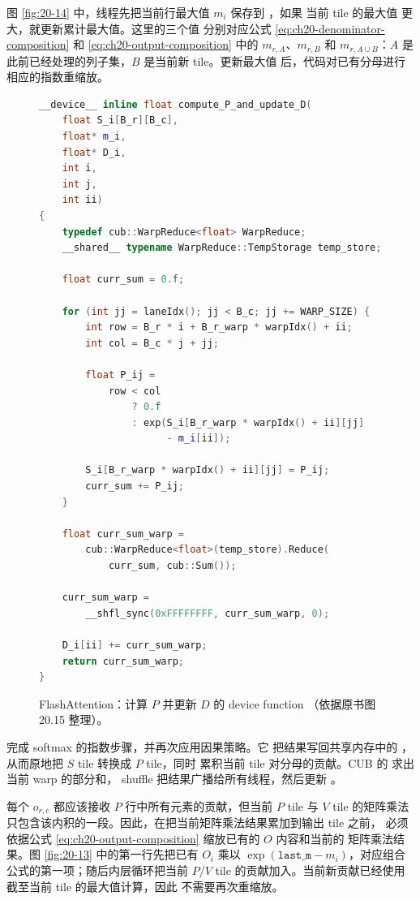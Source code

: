 图 \ref{fig:20-14} 中，线程先把当前行最大值 $m_i$ 保存到 ，如果
当前 tile 的最大值  更大，就更新累计最大值。这里的三个值
分别对应公式 \eqref{eq:ch20-denominator-composition} 和
\eqref{eq:ch20-output-composition} 中的 $m_{r,A}$、$m_{r,B}$ 和
$m_{r,A\cup B}$：$A$ 是此前已经处理的列子集，$B$ 是当前新 tile。更新最大值
后，代码对已有分母进行相应的指数重缩放。

\begin{figure}[htbp]
  \centering
  \begin{lstlisting}[language=C++,basicstyle=\ttfamily\tiny]
__device__ inline float compute_P_and_update_D(
    float S_i[B_r][B_c],
    float* m_i,
    float* D_i,
    int i,
    int j,
    int ii)
{
    typedef cub::WarpReduce<float> WarpReduce;
    __shared__ typename WarpReduce::TempStorage temp_store;

    float curr_sum = 0.f;

    for (int jj = laneIdx(); jj < B_c; jj += WARP_SIZE) {
        int row = B_r * i + B_r_warp * warpIdx() + ii;
        int col = B_c * j + jj;

        float P_ij =
            row < col
                ? 0.f
                : exp(S_i[B_r_warp * warpIdx() + ii][jj]
                      - m_i[ii]);

        S_i[B_r_warp * warpIdx() + ii][jj] = P_ij;
        curr_sum += P_ij;
    }

    float curr_sum_warp =
        cub::WarpReduce<float>(temp_store).Reduce(
            curr_sum, cub::Sum());

    curr_sum_warp =
        __shfl_sync(0xFFFFFFFF, curr_sum_warp, 0);

    D_i[ii] += curr_sum_warp;
    return curr_sum_warp;
}
  \end{lstlisting}
  \caption{FlashAttention：计算 $P$ 并更新 $D$ 的 device function
  （依据原书图 20.15 整理）。}
  \label{fig:20-15}
\end{figure}

 完成 softmax 的指数步骤，并再次应用因果策略。它
把结果写回共享内存中的 ，从而原地把 $S$ tile 转换成 $P$ tile，同时
累积当前 tile 对分母的贡献。CUB 的  求出当前 warp 的部分和，
shuffle 把结果广播给所有线程，然后更新 。

每个 $o_{r,c}$ 都应该接收 $P$ 行中所有元素的贡献，但当前 $P$ tile 与 $V$ tile
的矩阵乘法只包含该内积的一段。因此，在把当前矩阵乘法结果累加到输出 tile 之前，
必须依据公式 \eqref{eq:ch20-output-composition} 缩放已有的 $O$ 内容和当前的
矩阵乘法结果。图 \ref{fig:20-13} 中的第一行先把已有 $O_i$ 乘以
$\exp(\texttt{last\_m}-m_i)$，对应组合公式的第一项；随后内层循环把当前
$P$/$V$ tile 的贡献加入。当前新贡献已经使用截至当前 tile 的最大值计算，因此
不需要再次重缩放。

